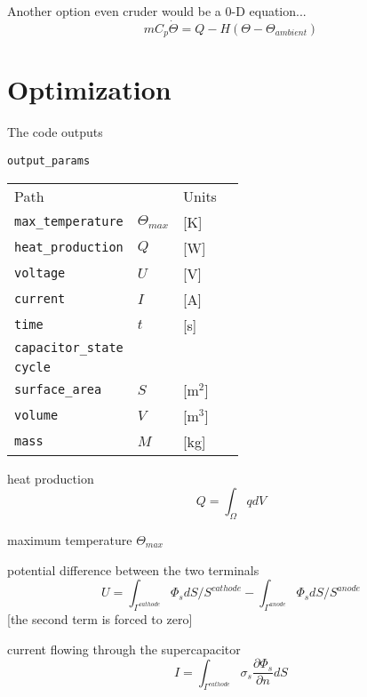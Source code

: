 \documentclass[10pt, oneside]{article}   	%
\begin{document}
Another option even cruder would be a 0-D equation...
\begin{equation}
m C_p \dot{\Theta} = Q - H (\Theta - \Theta_{ambient})
\end{equation}

\newpage
\section{Optimization}

The code outputs

\texttt{output\_params} \\
{\footnotesize
\begin{tabular}{llll}
Path                      &     & Units \\
\texttt{max\_temperature} & $\Theta_{max}$ & [K] \\
\texttt{heat\_production} & $Q$ & [W] \\
\texttt{voltage}          & $U$ & [V] \\
\texttt{current}          & $I$ & [A] \\
\texttt{time}             & $t$ & [s] \\
\texttt{capacitor\_state} \\
\texttt{cycle}            \\
\texttt{surface\_area}    & $S$ & [m$^2$] \\
\texttt{volume}           & $V$ & [m$^3$] \\
\texttt{mass}             & $M$ & [kg]    \\
\end{tabular}
}

heat production
\begin{equation}
Q = \int_\Omega q dV
\end{equation}

maximum temperature $\Theta_{max}$

potential difference between the two terminals
\begin{equation}
U = \int_{\Gamma^{cathode}} \Phi_s dS / S^{cathode} 
- \int_{\Gamma^{anode}} \Phi_s dS / S^{anode}
\end{equation}
[the second term is forced to zero]

current flowing through the supercapacitor
\begin{equation}
I = \int_{\Gamma^{cathode}} \sigma_s \frac{\partial \Phi_s}{\partial n} dS
\end{equation}
\end{document}
